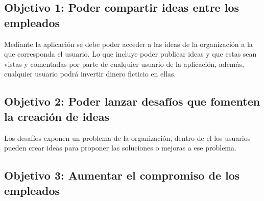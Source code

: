 \subsection{Objetivo 1: Poder compartir ideas entre los empleados}

Mediante la aplicación se debe poder acceder a las ideas de la organización a la que corresponda el usuario. Lo que 
incluye poder publicar ideas y que estas sean vistas y comentadas por parte de cualquier usuario de la aplicación, además, 
cualquier usuario podrá invertir dinero ficticio en ellas.

\subsection{Objetivo 2: Poder lanzar desafíos que fomenten la creación de ideas}
Los desafíos exponen un problema de la organización, dentro de el los usuarios pueden crear ideas para
proponer las soluciones o mejoras a ese problema.

\subsection{Objetivo 3: Aumentar el compromiso de los empleados}





